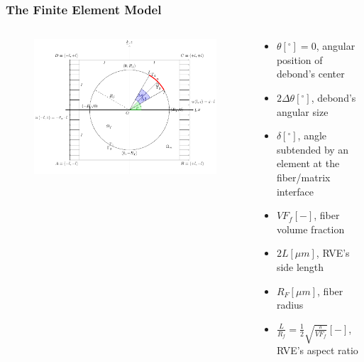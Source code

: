 \documentclass[first,firstsupp,lastsupp,last,hyperref,table]{ETHclass}
\begin{document}
\begin{frame}
\frametitle{\small The Finite Element Model}
\vspace{-0.5cm}
\centering
\begin{columns}
\begin{column}{0.6\textwidth}
\begin{figure}
\includegraphics[width=\columnwidth]{FEMfiberMatrixInterfaceProblem.pdf}
  \label{fig:jintegral}
\end{figure}
\end{column}
\begin{column}{0.4\textwidth}
\tiny
\begin{itemize}[label=]
\item $\theta\left[^{\circ}\right]=0$, angular position of debond's center\\[5pt]
\item $2\Delta\theta\left[^{\circ}\right]$, debond's angular size\\[5pt]
\item $\delta\left[^{\circ}\right]$, angle subtended by an element at the fiber/matrix interface\\[5pt]
\item $VF_{f}\left[-\right]$, fiber volume fraction\\[5pt]
\item $2L\left[\mu m\right]$, RVE's side length\\[5pt]
\item $R_{F}\left[\mu m\right]$, fiber radius\\[5pt]
\item $\frac{L}{R_{f}}=\frac{1}{2}\sqrt{\frac{\pi}{VF_{f}}}\left[-\right]$, RVE's aspect ratio\\[5pt]

\end{itemize}
\end{column}
\end{columns}
\end{frame}
\end{document}
